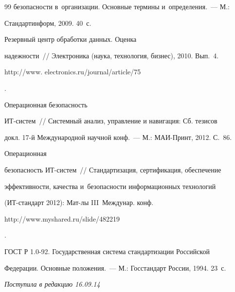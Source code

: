 {{\begin{thebibliography}{99}
безопасности в~организации. Основные термины и~определения.~--- М.:


Стандартинформ, 2009. 40~с.




 Резервный центр обработки данных. Оценка


надежности~/\!\!/ Электроника (наука, технология, бизнес), 2010. Вып.~4. {\sf


http://www. electronics.ru/journal/article/75}.




 Операционная безопасность


 ИТ-сис\-тем~/\!\!/ Сис\-тем\-ный анализ, управление и навигация: Сб. тезисов


докл. 17-й Международной научной конф.~--- М.: МАИ-Принт, 2012. С.~86.




 Операционная


безопасность ИТ-сис\-тем~/\!\!/ Стандартизация, сертификация, обеспечение


эффективности, качества и~безопасности информационных технологий


(ИТ-стандарт 2012): Мат-лы III~Междунар. конф. {\sf


http://www.myshared.ru/slide/482219}.




ГОСТ Р 1.0-92. Государственная система стандартизации Российской


Федерации. Основные положения.~--- М.: Госстандарт России, 1994. 23~с.


\end{thebibliography}


} }








\vspace*{-6pt}





\hfill{\small\textit{Поступила в редакцию 16.09.14}}













